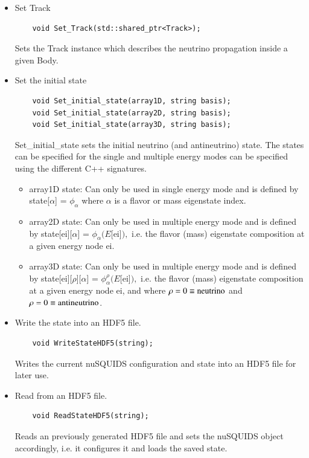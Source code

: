 \documentclass[3p,12pt,authoryear]{elsarticle}
\newcommand{\ttf}{\ttfamily}
\begin{document}
\begin{itemize}
\begin{lstlisting}
    void Set_Body(std::shared_ptr<Body>);
  \end{lstlisting}
  Sets the {\ttf Body} instance in which the neutrino propagation will take place.
  \item Set {\ttfamily Track}
  \begin{lstlisting}
    void Set_Track(std::shared_ptr<Track>);
  \end{lstlisting}
  Sets the {\ttf Track} instance which describes the neutrino propagation inside a
  given {\ttf Body}.
  \item Set the initial state
  \begin{lstlisting}
    void Set_initial_state(array1D, string basis);
    void Set_initial_state(array2D, string basis);
    void Set_initial_state(array3D, string basis);
  \end{lstlisting}
  {\ttf Set\_initial\_state} sets the initial neutrino (and antineutrino) state. The states
  can be specified for the single and multiple energy modes can be specified using the 
  different {\ttf C++} signatures.
  \begin{itemize}
  	\item {\ttf array1D state}: 
	Can only be used in single energy mode and is defined by 
	{\ttf state[$\alpha$]  = $\phi_\alpha$ } where $\alpha$ is a flavor or mass eigenstate index.
	\item {\ttf array2D state}: Can only be used in multiple energy mode and is defined
	by {\ttf state[ei][$\alpha$]  = $\phi_\alpha (E$[ei]$),$ } i.e. the flavor (mass) eigenstate composition at a given energy node {\ttf ei}.
	\item {\ttf array3D state}: Can only be used in multiple energy mode and is defined
	by {\ttf state[ei][$\rho$][$\alpha$]  = $\phi^{\rho}_\alpha (E$[ei]$),$ } i.e. the flavor (mass) eigenstate composition at a given energy node {\ttf ei}, and where $\rho = 0 \equiv {\rm neutrino}$ and $\rho = 0 \equiv {\rm antineutrino}$.
  \end{itemize}
  \item Write the state into an HDF5 file.
  \begin{lstlisting}
    void WriteStateHDF5(string);
  \end{lstlisting}
  Writes the current {\ttf nuSQUIDS} configuration and state into an HDF5 file
  for later use.
  \item Read from an HDF5 file.
  \begin{lstlisting}
    void ReadStateHDF5(string);
  \end{lstlisting}
  Reads an previously generated HDF5 file and sets the {\ttf nuSQUIDS} object
  accordingly, i.e. it configures it and loads the saved state.
\end{itemize}
\end{document}
